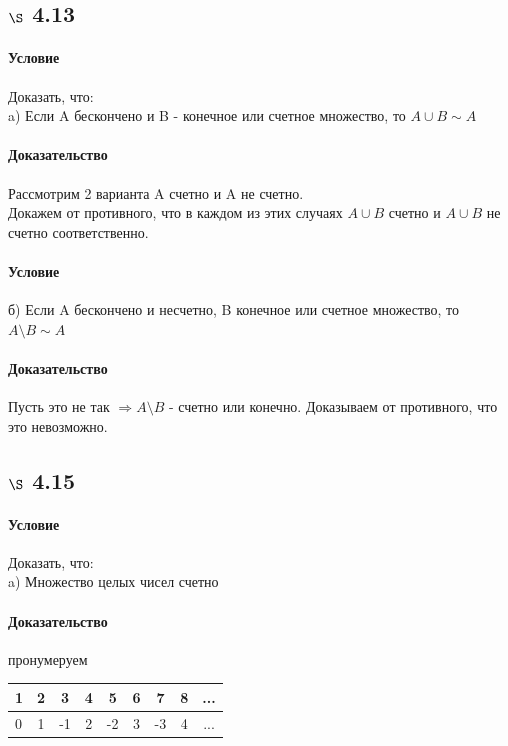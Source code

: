 \documentclass[a4paper,12pt]{article}
\begin{document}
\subsection*{$\S$ 4.13}
\paragraph*{Условие}
Доказать, что:\\
a) Если A бескончено и B - конечное или счетное множество, то $ A \cup B \sim A$
\paragraph*{Доказательство}
Рассмотрим 2 варианта A счетно и A не счетно.\\
Докажем от противного, что в каждом из этих случаях $A \cup B$ счетно и $A \cup B$  не счетно соответственно.
\paragraph*{Условие}
б) Если A бескончено и несчетно, B конечное или счетное множество, то $ A \setminus B \sim A$
\paragraph*{Доказательство}
Пусть это не так $\Rightarrow A \setminus B$ - счетно или конечно. Доказываем от противного, что это невозможно.

\subsection*{$\S$ 4.15}
\paragraph*{Условие}
Доказать, что:\\
a) Множество целых чисел счетно
\paragraph*{Доказательство}
пронумеруем
\begin{center}
  \begin{tabular}{ | l | c | c| c| c| c| c| c| c }
    \hline
    1 & 2 & 3  & 4 & 5  & 6 & 7  & 8 & ...\\ \hline
    0 & 1 & -1 & 2 & -2 & 3 & -3 & 4 & ...\\ \hline
  \end{tabular}
\end{center}
\end{document}
